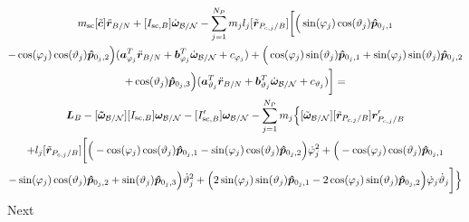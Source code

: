 \begin{multline}
	m_{\text{sc}}[\tilde{\bm{c}}]\ddot{\bm r}_{B/N}+[I_{\text{sc},B}] \dot{\bm\omega}_{\cal B/N}  - \sum\limits_{j=1}^{N_P}m_j l_j [\tilde{\bm{r}}_{P_{c,j}/B}] \bigg[
	\Big(\sin(\varphi_j)\cos(\vartheta_j)\bm{\hat{p}}_{0_j,1}\\-\cos(\varphi_j)\cos(\vartheta_j)\bm{\hat{p}}_{0_j,2}\Big)(\bm a_{\varphi_j}^T \ddot{\bm{r}}_{B/N} + \bm b_{\varphi_j}^T \dot{\bm\omega}_{\cal B/N}+c_{\varphi_j})
	+\Big(\cos(\varphi_j)\sin(\vartheta_j)\bm{\hat{p}}_{0_j,1}+\sin(\varphi_j)\sin(\vartheta_j)\bm{\hat{p}}_{0_j,2}\\+\cos(\vartheta_j)\bm{\hat{p}}_{0_j,3} \Big)(\bm a_{\vartheta_j}^T \ddot{\bm r}_{B/N} + \bm b_{\vartheta_j}^T \dot{\bm\omega}_{\cal B/N} + c_{\vartheta_j})
	\bigg] = \\
	\bm{L}_B-[\bm{\tilde{\omega}}_{\cal B/N}] [I_{\text{sc},B}] \bm\omega_{\cal B/N}
	- [I'_{\text{sc},B}] \bm\omega_{\cal B/N}- \sum\limits_{j=1}^{N_P} m_j \Big\{[\tilde{\bm\omega}_{\cal B/N}] [\tilde{\bm{r}}_{P_{c,j}/B}] \bm{r}'_{P_{c,j}/B}\\
	+l_j[\tilde{\bm{r}}_{P_{c,j}/B}]\bigg[
	\Big(-\cos(\varphi_j)\cos(\vartheta_j)\bm{\hat{p}}_{0_j,1}-\sin(\varphi_j)\cos(\vartheta_j)\bm{\hat{p}}_{0_j,2}\Big)\dot{\varphi}_j^2
	+\Big(-\cos(\varphi_j)\cos(\vartheta_j)\bm{\hat{p}}_{0_j,1}\\-\sin(\varphi_j)\cos(\vartheta_j)\bm{\hat{p}}_{0_j,2}+\sin(\vartheta_j)\bm{\hat{p}}_{0_j,3} \Big)\dot{\vartheta}_j^2 +
	\Big(2\sin(\varphi_j)\sin(\vartheta_j)\bm{\hat{p}}_{0_j,1} -2\cos(\varphi_j)\sin(\vartheta_j)\bm{\hat{p}}_{0_j,2}\Big)\dot{\varphi}_j\dot{\vartheta}_j
	\bigg]\Big\}
	\label{eq:Final6_1}
\end{multline}
Next

